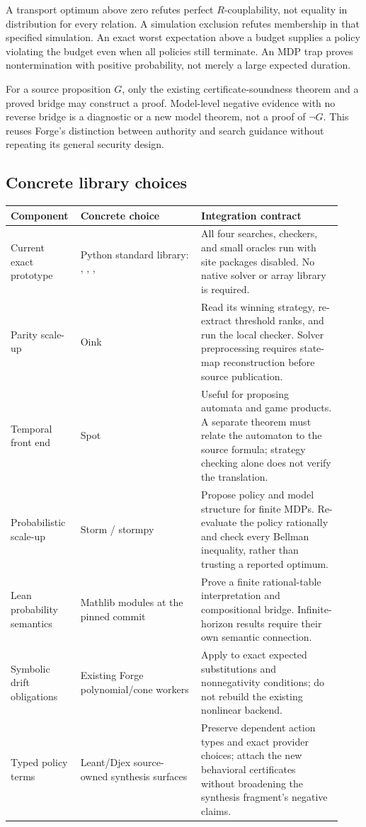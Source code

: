 A transport optimum above zero refutes perfect $R$-couplability, not equality in
distribution for every relation. A simulation exclusion refutes membership in
that specified simulation. An exact worst expectation above a budget supplies
a policy violating the budget even when all policies still terminate. An
MDP trap proves nontermination with positive probability, not merely a large
expected duration.

For a source proposition $G$, only the existing certificate-soundness theorem
and a proved bridge may construct a  proof.
Model-level negative evidence with no reverse bridge is a diagnostic or a new
model theorem, not a proof of $\neg G$. This reuses Forge's distinction between
authority and search guidance without repeating its general security design.

\subsection{Concrete library choices}

\begin{longtable}{@{}L{0.17\linewidth}L{0.35\linewidth}L{0.41\linewidth}@{}}
\toprule
Component & Concrete choice & Integration contract \\
\midrule
\endhead
Current exact prototype & Python standard library: ,
, ,  & All four searches,
checkers, and small oracles run with site packages disabled. No native solver
or array library is required. \\
Parity scale-up & Oink~\cite{oink} & Read its winning strategy, re-extract
threshold ranks, and run the local checker. Solver preprocessing requires
state-map reconstruction before source publication. \\
Temporal front end & Spot~\cite{spot} & Useful for proposing automata and game
products. A separate theorem must relate the automaton to the source formula;
strategy checking alone does not verify the translation. \\
Probabilistic scale-up & Storm / stormpy~\cite{storm} & Propose policy and model
structure for finite MDPs. Re-evaluate the policy rationally and check every
Bellman inequality, rather than trusting a reported optimum. \\
Lean probability semantics & Mathlib 
modules at the pinned commit~\cite{mathlib-pmf} & Prove a finite rational-table
interpretation and compositional  bridge. Infinite-horizon results
require their own semantic connection. \\
Symbolic drift obligations & Existing Forge polynomial/cone workers
\cite{forge-status} & Apply to exact expected substitutions and nonnegativity
conditions; do not rebuild the existing nonlinear backend. \\
Typed policy terms & Leant/Djex source-owned synthesis surfaces
\cite{leant,djex} & Preserve dependent action types and exact provider choices;
attach the new behavioral certificates without broadening the synthesis
fragment's negative claims. \\
\bottomrule
\end{longtable}

